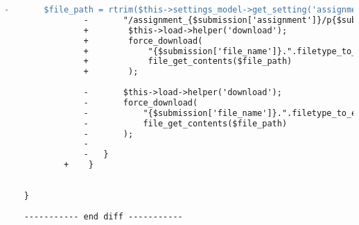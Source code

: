 \begin{lstlisting}[language=diff, caption=Perubahan pada kode Submissions.php]
				-		$file_path = rtrim($this->settings_model->get_setting('assignments_root'),'/').
				-		"/assignment_{$submission['assignment']}/p{$submission['problem']}/{$submission['username']}/{$submission['file_name']}.".filetype_to_extension($submission['file_type']);
				+        $this->load->helper('download');
				+        force_download(
				+            "{$submission['file_name']}.".filetype_to_extension($submission['file_type']),
				+            file_get_contents($file_path)
				+        );
				
				-		$this->load->helper('download');
				-		force_download(
				-			"{$submission['file_name']}.".filetype_to_extension($submission['file_type']),
				-			file_get_contents($file_path)
				-		);
				-
				-	}
			+    }
		
		
	}
	
	----------- end diff -----------
\end{lstlisting}

